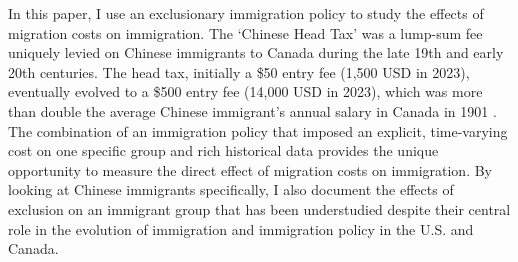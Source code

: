 


In this paper, I use an exclusionary immigration policy to study the effects of migration costs on immigration. The `Chinese Head Tax' was a lump-sum fee uniquely levied on Chinese immigrants to Canada during the late 19th and early 20th centuries. The head tax, initially a \$50 entry fee (1,500 USD in 2023), eventually evolved to a \$500 entry fee (14,000 USD in 2023), which was more than double the average Chinese immigrant's annual salary in Canada in 1901 \citep{census1901}. The combination of an immigration policy that imposed an explicit, time-varying cost on one specific group and rich historical data provides the unique opportunity to measure the direct effect of migration costs on immigration. By looking at Chinese immigrants specifically, I also document the effects of exclusion on an immigrant group that has been understudied despite their central role in the evolution of immigration and immigration policy in the U.S. and Canada.

